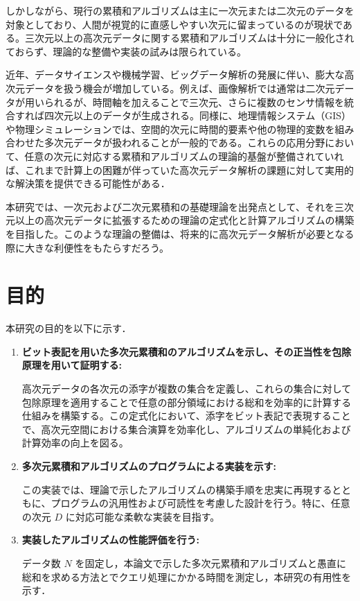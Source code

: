 \documentclass[11pt]{jsreport}
\theoremstyle{plain} %
\theoremstyle{definition}
\begin{document}
しかしながら、現行の累積和アルゴリズムは主に一次元または二次元のデータを対象としており、人間が視覚的に直感しやすい次元に留まっているのが現状である。三次元以上の高次元データに関する累積和アルゴリズムは十分に一般化されておらず、理論的な整備や実装の試みは限られている。

近年、データサイエンスや機械学習、ビッグデータ解析の発展に伴い、膨大な高次元データを扱う機会が増加している。例えば、画像解析では通常は二次元データが用いられるが、時間軸を加えることで三次元、さらに複数のセンサ情報を統合すれば四次元以上のデータが生成される。同様に、地理情報システム（GIS）や物理シミュレーションでは、空間的次元に時間的要素や他の物理的変数を組み合わせた多次元データが扱われることが一般的である。これらの応用分野において、任意の次元に対応する累積和アルゴリズムの理論的基盤が整備されていれば、これまで計算上の困難が伴っていた高次元データ解析の課題に対して実用的な解決策を提供できる可能性がある．

本研究では、一次元および二次元累積和の基礎理論を出発点として、それを三次元以上の高次元データに拡張するための理論の定式化と計算アルゴリズムの構築を目指した。このような理論の整備は、将来的に高次元データ解析が必要となる際に大きな利便性をもたらすだろう。


\section{目的}

本研究の目的を以下に示す．

\begin{enumerate}
    \item \textbf{ビット表記を用いた多次元累積和のアルゴリズムを示し、その正当性を包除原理を用いて証明する:}


     高次元データの各次元の添字が複数の集合を定義し、これらの集合に対して包除原理を適用することで任意の部分領域における総和を効率的に計算する仕組みを構築する。この定式化において、添字をビット表記で表現することで、高次元空間における集合演算を効率化し、アルゴリズムの単純化および計算効率の向上を図る。

    \item \textbf{多次元累積和アルゴリズムのプログラムによる実装を示す:}

    この実装では、理論で示したアルゴリズムの構築手順を忠実に再現するとともに、プログラムの汎用性および可読性を考慮した設計を行う。特に、任意の次元 \(D\) に対応可能な柔軟な実装を目指す。

    \item \textbf{実装したアルゴリズムの性能評価を行う:}

    データ数 \(N\) を固定し，本論文で示した多次元累積和アルゴリズムと愚直に総和を求める方法とでクエリ処理にかかる時間を測定し，本研究の有用性を示す．

\end{enumerate}
\end{document}
